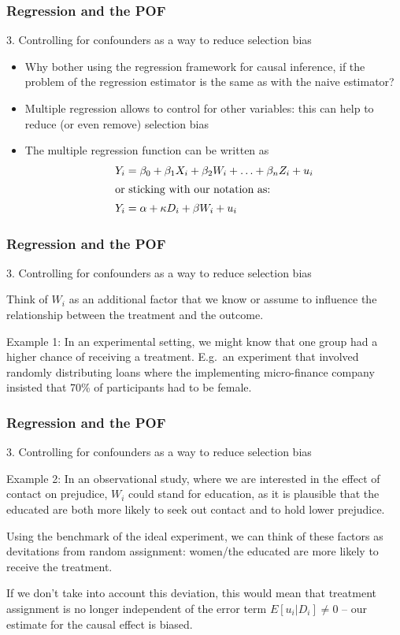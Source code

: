 \documentclass[12pt,english,dvipsnames,aspectratio=169,handout]{beamer}\usepackage[]{graphicx}\usepackage[]{xcolor}
\begin{document}
\begin{frame}
\frametitle{Regression and the POF}

3. Controlling for confounders as a way to reduce selection bias

\begin{itemize}
  \item Why bother using the regression framework for causal inference, if the problem of the regression estimator is the same as with the naive estimator?
  \item Multiple regression allows to control for other variables: this can help to reduce (or even remove) selection bias
  \item The multiple regression function can be written as
  \begin{align*}
  Y_i &= \beta_0 + \beta_1 X_i + \beta_2 W_i + \ldots + \beta_n Z_i + u_i \\
  \shortintertext{or sticking with our notation as:}
  Y_i &= \alpha + \kappa D_i + \beta W_i + u_i
  \end{align*}
\end{itemize}

\end{frame}




\begin{frame}
\frametitle{Regression and the POF}

3. Controlling for confounders as a way to reduce selection bias

\small
Think of $W_i$ as an additional factor that we know or assume to influence the relationship between the treatment and the outcome. 

Example 1: In an experimental setting, we might know that one group had a higher chance of receiving a treatment. E.g.\ an experiment that involved randomly distributing loans where the implementing micro-finance company insisted that 70\% of participants had to be female. 

\end{frame}




\begin{frame}
\frametitle{Regression and the POF}

3. Controlling for confounders as a way to reduce selection bias

\small
Example 2: In an observational study, where we are interested in the effect of contact on prejudice, $W_i$ could stand for education, as it is plausible that the educated are both more likely to seek out contact and to hold lower prejudice.

Using the benchmark of the ideal experiment, we can think of these factors as devitations from random assignment: women/the educated are more likely to receive the treatment.

If we don't take into account this deviation, this would mean that treatment assignment is no longer independent of the error term $E[u_i|D_i] \neq 0$ -- our estimate for the causal effect is biased.

\end{frame}
\end{document}
